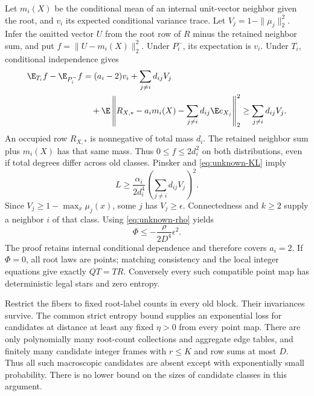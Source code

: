 Let $m_i(X)$ be the conditional mean of an internal unit-vector
neighbor given the root, and $v_i$ its expected conditional variance
trace. Let $V_j=1-\|\mu_j\|_2^2$. Infer the omitted vector $U$ from
the root row of $R$ minus the retained neighbor sum, and put
$f=\|U-m_i(X)\|_2^2$. Under $P_i^-$, its expectation is $v_i$.
Under $T_i$, conditional independence gives
\begin{align}\label{eq:unknown-variance}
 \E_{T_i}f-\E_{P_i^-}f
 &=(a_i-2)v_i+\sum_{j\ne i}d_{ij}V_j\notag\\
 &\quad+\E\left\|R_{X,*}-a_im_i(X)
                   -\sum_{j\ne i}d_{ij}\E e_{X_j}\right\|_2^2
 \ge\sum_{j\ne i}d_{ij}V_j.
\end{align}
An occupied row $R_{X,*}$ is nonnegative of total mass $d_i$.
The retained neighbor sum plus $m_i(X)$ has that same mass.
Thus $0\le f\le2d_i^2$ on both distributions, even if total degrees
differ across old classes. Pinsker and \eqref{eq:unknown-KL} imply
\begin{equation}\label{eq:unknown-local-gap}
 L\ge\frac{\alpha_i}{2d_i^4}
          \left(\sum_{j\ne i}d_{ij}V_j\right)^2.
\end{equation}
Since $V_j\ge1-\max_x\mu_j(x)$, some $j$ has $V_j\ge\epsilon$.
Connectedness and $k\ge2$ supply a neighbor $i$ of that class.
Using \eqref{eq:unknown-rho} yields
\begin{equation}\label{eq:unknown-gap}
 \Phi\le-\frac{\rho}{2D^4}\epsilon^2.
\end{equation}
The proof retains internal conditional dependence and therefore
covers $a_i=2$. If $\Phi=0$, all root laws are points; matching
consistency and the local integer equations give exactly $QT=TR$.
Conversely every such compatible point map has deterministic legal
stars and zero entropy.



Restrict the fibers to fixed root-label counts in every old block.
Their invariances survive. The common strict entropy bound supplies
an exponential loss for candidates at distance at least any fixed
$\eta>0$ from every point map. There are only polynomially many
root-count collections and aggregate edge tables, and finitely many
candidate integer frames with $r\le K$ and row sums at most $D$.
Thus all such macroscopic candidates are absent except with
exponentially small probability. There is no lower bound on the
sizes of candidate classes in this argument.

